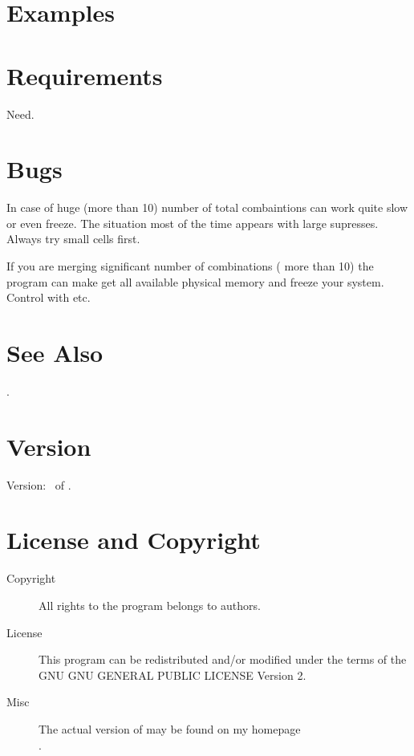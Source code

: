 \documentclass[a4paper,english]{article}
\begin{document}
\section{Examples}


\section{Requirements}

\begin{description}\setlength{\itemsep}{0cm}
\item[openbabel] Need.
\end{description}

\section{Bugs}

\begin{description}\setlength{\itemsep}{0cm}
\item In case of huge (more than 10) number of total combaintions  can work quite slow or even freeze. The situation most of the time appears with large supresses. Always try small cells first.
\item If you are merging significant number of combinations ( more than 10) the program can make get all available physical memory and freeze your system. Control  with  etc.

\end{description}

\section{See Also}

.


\section{Version}

Version: \Version\ of \Date.

\section{License and Copyright}

\begin{description}
\item[Copyright] 
     All rights to the program belongs to authors.

\item[License] This program can be redistributed and/or modified under the
     terms of the GNU GNU GENERAL PUBLIC LICENSE Version 2.

\item[Misc]
     The actual version of   may be found on my homepage\\
     .

\end{description}
\end{document}
